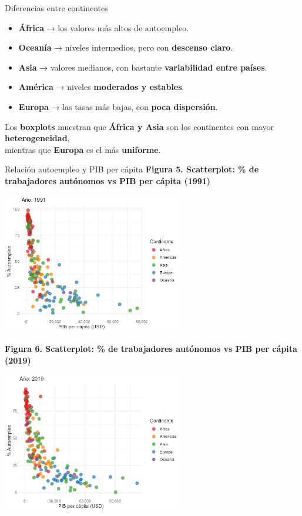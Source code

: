 \documentclass[
  ignorenonframetext,
]{beamer}
\providecommand{\tightlist}{%
  \setlength{\itemsep}{0pt}\setlength{\parskip}{0pt}}
\begin{document}
\begin{frame}{Diferencias entre continentes}
\label{diferencias-entre-continentes-1}
\begin{itemize}
\tightlist
\item
  \textbf{África} → los valores más altos de autoempleo.\\
\item
  \textbf{Oceanía} → niveles intermedios, pero con \textbf{descenso
  claro}.\\
\item
  \textbf{Asia} → valores medianos, con bastante \textbf{variabilidad
  entre países}.\\
\item
  \textbf{América} → niveles \textbf{moderados y estables}.\\
\item
  \textbf{Europa} → las tasas más bajas, con \textbf{poca dispersión}.
\end{itemize}

Los \textbf{boxplots} muestran que \textbf{África y Asia} son los
continentes con mayor \textbf{heterogeneidad},\\
mientras que \textbf{Europa} es el más \textbf{uniforme}.
\end{frame}

\begin{frame}{Relación autoempleo y PIB per cápita}
\label{relaciuxf3n-autoempleo-y-pib-per-cuxe1pita}
\textbf{Figura 5. Scatterplot: \% de trabajadores autónomos vs PIB per
cápita (1991)}

\includegraphics[width=3.125in,height=\textheight]{../informe/img/pib_vs_autonomos_1991.png}

\textbf{Figura 6. Scatterplot: \% de trabajadores autónomos vs PIB per
cápita (2019)}

\includegraphics[width=3.125in,height=\textheight]{../informe/img/pib_vs_autonomos_2019.png}
\end{frame}
\end{document}
